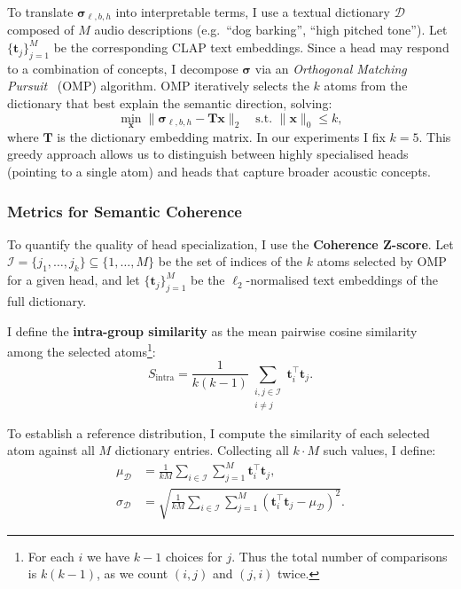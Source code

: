 To translate $\mathbf{\sigma}_{\ell,b,h}$ into interpretable terms, I use
a textual dictionary $\mathcal{D}$ composed of $M$ audio descriptions
(e.g.\ ``dog barking'', ``high pitched tone''). Let $\{\mathbf{t}_j\}_{j=1}^M$
be the corresponding CLAP text embeddings.
Since a head may respond to a combination of concepts, I decompose
$\mathbf{\sigma}$ via an \emph{Orthogonal Matching Pursuit}~\cite{OrthogonalMatchingPursuit} (OMP) algorithm.
OMP iteratively selects the $k$ atoms from the dictionary that best explain
the semantic direction, solving:
\begin{equation}
    \min_{\mathbf{x}} \|\mathbf{\sigma}_{\ell,b,h} - \mathbf{T}\mathbf{x}\|_2 \quad \text{s.t. } \|\mathbf{x}\|_0 \leq k,
\end{equation}
where $\mathbf{T}$ is the dictionary embedding matrix. In our experiments I
fix $k=5$. This greedy approach allows us to distinguish between highly
specialised heads (pointing to a single atom) and heads that capture broader
acoustic concepts.

\subsubsection{Metrics for Semantic Coherence}
To quantify the quality of head specialization, I use the \textbf{Coherence Z-score}. 
Let $\mathcal{I} = \{j_1, \ldots, j_k\} \subseteq \{1, \ldots, M\}$ be the set of indices 
of the $k$ atoms selected by OMP for a given head, and let 
$\{\mathbf{t}_j\}_{j=1}^M$ be the $\ell_2$-normalised text embeddings of the full dictionary.
 
I define the \textbf{intra-group similarity} as the mean pairwise cosine similarity 
among the selected atoms\footnote{For each $i$ we have $k-1$ choices for $j$. 
Thus the total number of comparisons is $k(k-1)$, as we count $(i, j)$ and $(j, i)$ twice.}:
\begin{equation}
S_{\mathrm{intra}} 
= \frac{1}{k(k-1)} 
\sum_{\substack{i,j \in \mathcal{I} \\ i \neq j}} 
\mathbf{t}_i^\top \mathbf{t}_j.
\end{equation}

To establish a reference distribution, I compute the similarity of each selected atom 
against all $M$ dictionary entries. Collecting all $k \cdot M$ such values, I define:
\begin{align}
\mu_{\mathcal{D}} 
&= \frac{1}{k M} 
\sum_{i \in \mathcal{I}} \sum_{j=1}^{M} 
\mathbf{t}_i^\top \mathbf{t}_j,\\
\sigma_{\mathcal{D}} 
&= \sqrt{
\frac{1}{k M} 
\sum_{i \in \mathcal{I}} \sum_{j=1}^{M} 
\left(\mathbf{t}_i^\top \mathbf{t}_j - \mu_{\mathcal{D}}\right)^2
}.
\end{align}
 

